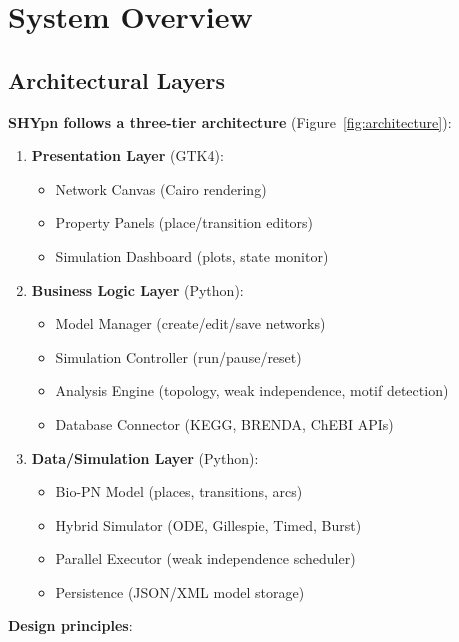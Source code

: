 \section{System Overview}
\label{sec:system-overview}

\subsection{Architectural Layers}
\label{subsec:architectural-layers}

\textbf{SHYpn follows a three-tier architecture} (Figure~\ref{fig:architecture}):

\begin{enumerate}
    \item \textbf{Presentation Layer} (GTK4):
    \begin{itemize}
        \item Network Canvas (Cairo rendering)
        \item Property Panels (place/transition editors)
        \item Simulation Dashboard (plots, state monitor)
    \end{itemize}
    
    \item \textbf{Business Logic Layer} (Python):
    \begin{itemize}
        \item Model Manager (create/edit/save networks)
        \item Simulation Controller (run/pause/reset)
        \item Analysis Engine (topology, weak independence, motif detection)
        \item Database Connector (KEGG, BRENDA, ChEBI APIs)
    \end{itemize}
    
    \item \textbf{Data/Simulation Layer} (Python):
    \begin{itemize}
        \item Bio-PN Model (places, transitions, arcs)
        \item Hybrid Simulator (ODE, Gillespie, Timed, Burst)
        \item Parallel Executor (weak independence scheduler)
        \item Persistence (JSON/XML model storage)
    \end{itemize}
\end{enumerate}

\textbf{Design principles}:


